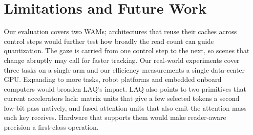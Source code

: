 \section{Limitations and Future Work}
\label{sec:limitations}

Our evaluation covers two WAMs; architectures that reuse their caches across control steps would further test how broadly the read count can guide quantization.
The gaze is carried from one control step to the next, so scenes that change abruptly may call for faster tracking.
Our real-world experiments cover three tasks on a single arm and our efficiency measurements a single data-center GPU. Expanding to more tasks, robot platforms and embedded onboard computers would broaden LAQ's impact.
LAQ also points to two primitives that current accelerators lack: matrix units that give a few selected tokens a second low-bit pass natively, and fused attention units that also emit the attention mass each key receives. Hardware that supports them would make reader-aware precision a first-class operation.
